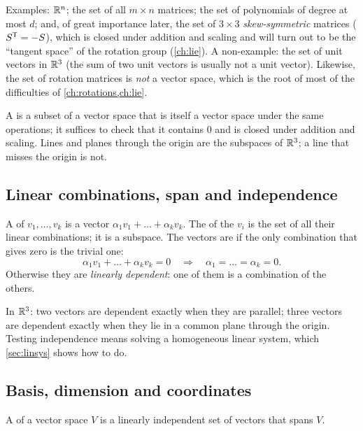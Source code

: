 Examples: $\mathbb{R}^n$; the set of all $m\times n$ matrices; the set of polynomials of degree at most $d$; and, of great
importance later, the set of $3\times3$ \emph{skew-symmetric} matrices ($S^{\mathsf{T}} = -S$), which is closed under addition
and scaling and will turn out to be the ``tangent space'' of the rotation group (\cref{ch:lie}). A non-example:
the set of unit vectors in $\mathbb{R}^3$ (the sum of two unit vectors is usually not a unit vector). Likewise, the set of
rotation matrices is \emph{not} a vector space, which is the root of most of the difficulties of
\cref{ch:rotations,ch:lie}.

A  is a subset of a vector space that is itself a vector space under the same operations; it
suffices to check that it contains $0$ and is closed under addition and scaling. Lines and planes through the
origin are the subspaces of $\mathbb{R}^3$; a line that misses the origin is not.

\subsection{Linear combinations, span and independence}

\begin{definition}
A  of $v_1, \dots, v_k$ is a vector $\alpha_1v_1 + \dots + \alpha_kv_k$. The
 of the $v_i$ is the set of all their linear combinations; it is a subspace. The vectors are
 if the only combination that gives zero is the trivial one:
\begin{equation}
  \alpha_1v_1 + \dots + \alpha_kv_k = 0 \quad\Longrightarrow\quad \alpha_1 = \dots = \alpha_k = 0 .
\end{equation}
Otherwise they are \emph{linearly dependent}: one of them is a combination of the others.
\end{definition}

In $\mathbb{R}^3$: two vectors are dependent exactly when they are parallel; three vectors are dependent exactly when
they lie in a common plane through the origin. Testing independence means solving a homogeneous linear system,
which \cref{sec:linsys} shows how to do.

\subsection{Basis, dimension and coordinates}

\begin{definition}[Basis]
A  of a vector space $V$ is a linearly independent set of vectors that spans $V$.
\end{definition}

